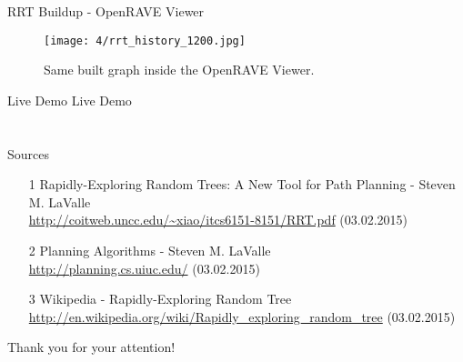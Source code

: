 \documentclass[%
  professionalfonts,%
  xcolor={%
    usenames,%
    dvipsnames,%
    svgnames,%
    table,%
    hyperref%
  }%
]{beamer}
\begin{document}
\begin{frame}{RRT Buildup - OpenRAVE Viewer}
	\begin{figure}[h]
		\centering
		\texttt{[image: 4/rrt\_history\_1200.jpg]}
		\caption{Same built graph inside the OpenRAVE Viewer.}
	\end{figure}
\end{frame}

\begin{frame}{Live Demo}
	\centering\Huge{Live Demo}
\end{frame}

\section{}
\begin{frame}{Sources}
	\begin{itemize}
		\item[1] Rapidly-Exploring Random Trees: A New Tool for Path Planning - Steven M. LaValle
		\\\url{http://coitweb.uncc.edu/~xiao/itcs6151-8151/RRT.pdf} (03.02.2015)
		\item[2] Planning Algorithms - Steven M. LaValle
		\\\url{http://planning.cs.uiuc.edu/} (03.02.2015)
		\item[3] Wikipedia - Rapidly-Exploring Random Tree
		\\\url{http://en.wikipedia.org/wiki/Rapidly_exploring_random_tree} (03.02.2015)
	\end{itemize}
\end{frame}

\begin{frame}
	\centering\Huge{Thank you for your attention!}
\end{frame}
\end{document}
